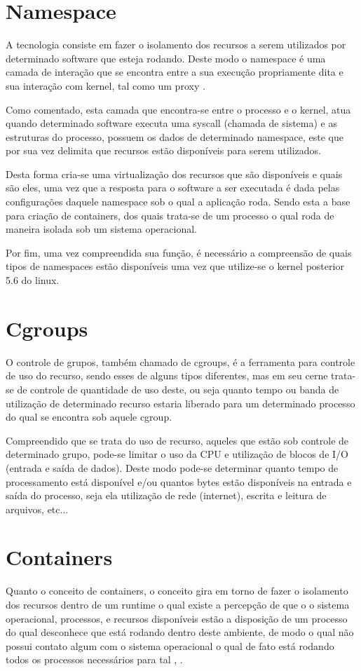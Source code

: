 \section{Namespace}
\label{chp:referencial_teorico::sct:namespace}
A tecnologia consiste em fazer o isolamento dos recursos a serem utilizados por determinado software que esteja rodando. Deste modo o namespace é uma camada de interação que se encontra entre a sua execução propriamente dita e sua interação com kernel, tal como um proxy \cite{kernelscheepers}.

Como comentado, esta camada que encontra-se entre o processo e o kernel, atua quando determinado software executa uma syscall (chamada de sistema) e as estruturas do processo, possuem os dados de determinado namespace, este que por sua vez delimita que recursos estão disponíveis para serem utilizados.

Desta forma cria-se uma virtualização dos recursos que são disponíveis e quais são eles, uma vez que a resposta para o software a ser executada é dada pelas configurações daquele namespace sob o qual a aplicação roda. Sendo esta a base para criação de containers, dos quais trata-se de um processo o qual roda de maneira isolada sob um sistema operacional.

Por fim, uma vez compreendida sua função, é necessário a compreensão de quais tipos de namespaces estão disponíveis uma vez que utilize-se o kernel posterior 5.6 do linux.

\section{Cgroups}
\label{chp:referencial_teorico::sct:cgroup}
O controle de grupos, também chamado de cgroups, é a ferramenta para controle de uso do recurso, sendo esses de alguns tipos diferentes, mas em seu cerne trata-se de controle de quantidade de uso deste, ou seja quanto tempo ou banda de utilização de determinado recurso estaria liberado para um determinado processo do qual se encontra sob aquele cgroup.

Compreendido que se trata do uso de recurso, aqueles que estão sob controle de determinado grupo, pode-se limitar o uso da CPU e utilização de blocos de I/O (entrada e saída de dados). Deste modo pode-se determinar quanto tempo de processamento está disponível e/ou quantos bytes estão disponíveis na entrada e saída do processo, seja ela utilização de rede (internet), escrita e leitura de arquivos, etc...

\section{Containers}
\label{chp:referencial_teorico::sct:containers}
Quanto o conceito de containers, o conceito gira em torno de fazer o isolamento dos recursos dentro de um runtime o qual existe a percepção de que o o sistema operacional, processos, e recursos disponíveis estão a disposição de um processo do qual desconhece que está rodando dentro deste ambiente, de modo o qual não possui contato algum com o sistema operacional o qual de fato está rodando todos os processos necessários para tal \cite{what-container}, \cite{what-are-container}.

